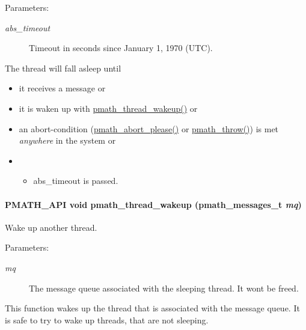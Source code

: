 \begin{Desc}
\item[Parameters:]
\begin{description}
\item[{\em abs\_\-timeout}]Timeout in seconds since January 1, 1970 (UTC).\end{description}
\end{Desc}
The thread will fall asleep until\begin{itemize}
\item it receives a message or\item it is waken up with \hyperlink{group__threadmsg_gbf90d49f5c42ccaa736ae5e56af6a4a6}{pmath\_\-thread\_\-wakeup()} or\item an abort-condition (\hyperlink{group__threads_g84e45036b76764def6390af12d2070bf}{pmath\_\-abort\_\-please()} or \hyperlink{group__threads_gf1aa6d6603faaa4120207be6108e356c}{pmath\_\-throw()}) is met {\em anywhere\/} in the system or\item \begin{itemize}
\item abs\_\-timeout is passed.\end{itemize}
\end{itemize}
\hypertarget{group__threadmsg_gbf90d49f5c42ccaa736ae5e56af6a4a6}{
\paragraph[{pmath\_\-thread\_\-wakeup}]{\setlength{\rightskip}{0pt plus 5cm}PMATH\_\-API void pmath\_\-thread\_\-wakeup ({\bf pmath\_\-messages\_\-t} {\em mq})}\hfill}
\label{group__threadmsg_gbf90d49f5c42ccaa736ae5e56af6a4a6}


Wake up another thread. 

\begin{Desc}
\item[Parameters:]
\begin{description}
\item[{\em mq}]The message queue associated with the sleeping thread. It wont be freed.\end{description}
\end{Desc}
This function wakes up the thread that is associated with the message queue. It is safe to try to wake up threads, that are not sleeping.

